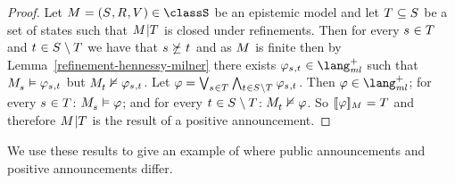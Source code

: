 \begin{proof}
    Let $\kModelAndTuple \in \classS$ be an epistemic model and
    let $\kStatesT \subseteq \kStates$ be a set of states such that $\restrict{\kModel}{\kStatesT}$ is closed under refinements.
    Then for every $\kStateS \in \kStatesT$ and $\kStateT \in \kStates \setminus \kStatesT$ we have that $\kStateS \not\simulates \kStateT$ and as $\kModel$ is finite then by Lemma~\ref{refinement-hennessy-milner} there exists $\phi_{\kStateS,\kStateT} \in \langMlPlus$ such that $\kPModel{\kStateS} \entails \phi_{\kStateS,\kStateT}$ but $\kPModel{\kStateT} \nentails \phi_{\kStateS,\kStateT}$.
    Let $\phi = \bigvee_{\kStateS \in \kStatesT} \bigwedge_{\kStateT \in \kStates \setminus \kStatesT} \phi_{\kStateS, \kStateT}$.
    Then $\phi \in \langMlPlus$; 
    for every $\kStateS \in \kStatesT$: $\kPModel{\kStateS} \entails \phi$; 
    and for every $\kStateT \in \kStates \setminus \kStatesT$: $\kPModel{\kStateT} \nentails \phi$.
    So $\interpretation[\kModel]{\phi} = \kStatesT$ and therefore $\restrict{\kModel}{\kStatesT}$ is the result of a positive announcement.
\end{proof}

We use these results to give an example of where public announcements and positive announcements differ.

